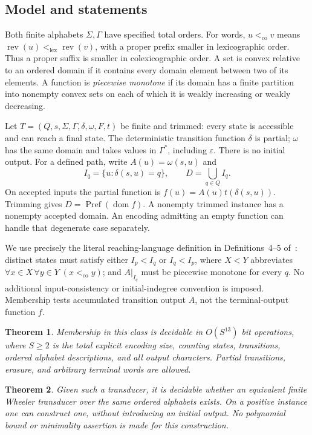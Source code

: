 \documentclass[acmsmall,screen,nonacm,11pt]{acmart}
\newcommand{\eps}{\varepsilon}
\newcommand{\co}{\mathrel{<_{\mathrm{co}}}}
\newcommand{\rev}{\operatorname{rev}}
\newcommand{\dom}{\operatorname{dom}}
\newcommand{\Pref}{\operatorname{Pref}}
\newtheorem{theorem}{Theorem}[section]
\theoremstyle{definition}
\begin{document}
\subsection{Model and statements}

Both finite alphabets $\Sigma,\Gamma$ have specified total orders. For words,
$u\co v$ means $\rev(u)<_{\mathrm{lex}}\rev(v)$, with a proper prefix smaller
in lexicographic order. Thus a proper suffix is smaller in colexicographic
order. A set is convex relative to an ordered domain if it contains every
domain element between two of its elements. A function is \emph{piecewise
monotone} if its domain has a finite partition into nonempty convex sets on
each of which it is weakly increasing or weakly decreasing.

Let $T=(Q,s,\Sigma,\Gamma,\delta,\omega,F,t)$ be finite and trimmed:
every state is accessible and can reach a final state. The deterministic
transition function $\delta$ is partial; $\omega$ has the same domain and
takes values in $\Gamma^*$, including $\eps$. There is no initial output.
For a defined path, write $A(u)=\omega(s,u)$ and
\[
 I_q=\{u:\delta(s,u)=q\},\qquad D=\bigcup_{q\in Q}I_q.
\]
On accepted inputs the partial function is $f(u)=A(u)t(\delta(s,u))$.
Trimming gives $D=\Pref(\dom f)$. A nonempty trimmed instance has a
nonempty accepted domain. An encoding admitting an empty function can handle
that degenerate case separately.

We use precisely the literal reaching-language definition in
Definitions~4--5 of~\cite{DP26}: distinct states must satisfy either
$I_p<I_q$ or $I_q<I_p$, where $X<Y$ abbreviates
$\forall x\in X\,\forall y\in Y\;(x\co y)$; and $A|_{I_q}$ must be
piecewise monotone for every $q$. No additional input-consistency or
initial-indegree convention is imposed. Membership tests accumulated
transition output $A$, not the terminal-output function $f$.

\begin{theorem}\label{thm:member}
Membership in this class is decidable in $O(S^{13})$ bit operations, where
$S\geq2$ is the total explicit encoding size, counting states, transitions,
ordered alphabet descriptions, and all output characters. Partial
transitions, erasure, and arbitrary terminal words are allowed.
\end{theorem}

\begin{theorem}\label{thm:realize}
Given such a transducer, it is decidable whether an equivalent finite Wheeler
transducer over the same ordered alphabets exists. On a positive instance one
can construct one, without introducing an initial output. No polynomial bound
or minimality assertion is made for this construction.
\end{theorem}
\end{document}
